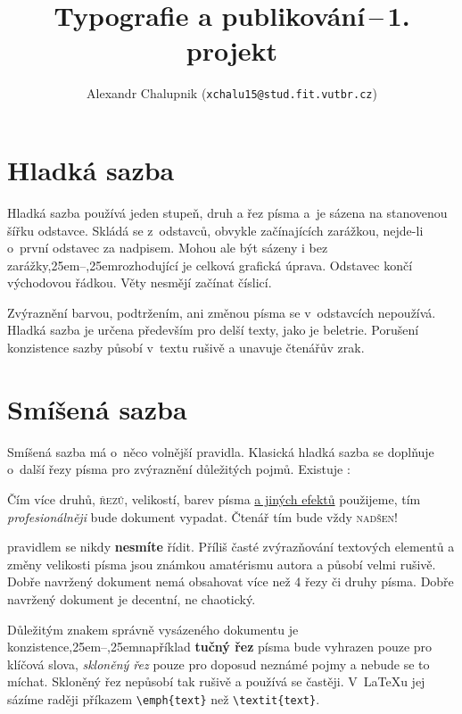 \documentclass[10pt, a4paper,twocolumn]{article}
\title{Typografie a publikování\,--\,1. projekt}
\author{Alexandr Chalupnik (\texttt{xchalu15@stud.fit.vutbr.cz})}
\date{}
\def\,{\kern 0,25em}
\begin{document}
\maketitle

\section{Hladká sazba}

Hladká sazba používá jeden stupeň, druh a řez písma a~je sázena na stanovenou šířku odstavce. Skládá se z~odstavců, obvykle začínajících zarážkou, nejde-li o~první odstavec za nadpisem. Mohou ale být sázeny i bez zarážky\,--\,rozhodující je celková grafická úprava. Odstavec končí východovou řádkou. Věty nesmějí začínat číslicí.\par
Zvýraznění barvou, podtržením, ani změnou písma se v~odstavcích nepoužívá. Hladká sazba je určena především pro delší texty, jako je beletrie. Porušení konzistence sazby působí v~textu rušivě a unavuje čtenářův zrak.

\section{Smíšená sazba}

Smíšená sazba má o~něco volnější pravidla. Klasická hladká sazba se doplňuje o~další řezy písma pro zvýraznění důležitých pojmů. Existuje :
\bigskip
\begin{adjustwidth}{0.7cm}{0.7cm}
\quad
{ \selectfont Čím více druhů,} \textsc{řezů,} {\tiny velikostí}, 
barev písma \underline{a jiných efektů} použijeme, tím \emph{\large profesionálněji}  bude dokument vypadat. Čtenář tím bude vždy \textsc{nadšen}!
\end{adjustwidth}
\bigskip
{} pravidlem se nikdy \textbf{nesmíte} řídit. Příliš časté {\large zvýrazňování} textových elementů a změny velikosti {\fontsize{21}{25} \selectfont písma} jsou známkou amatérismu autora a působí {\fontsize{30}{36} \selectfont velmi} rušivě. Dobře navržený dokument nemá obsahovat více než 4 řezy či druhy písma. Dobře navržený dokument je decentní, ne chaotický.

Důležitým znakem správně vysázeného dokumentu je konzistence\,--\,například \textbf{tučný řez} písma bude vyhrazen pouze pro klíčová slova, \emph{skloněný řez} pouze pro doposud neznámé pojmy a nebude se to míchat. Skloněný řez nepůsobí tak rušivě a používá se častěji. V~\LaTeX u jej sázíme raději příkazem \verb|\emph{text}| než \verb|\textit{text}|.
\end{document}
